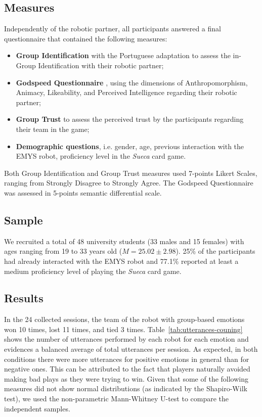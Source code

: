 \subsection{Measures}
Independently of the robotic partner, all participants answered a  final questionnaire that contained the following measures:
\begin{itemize}
\item \textbf{Group Identification} \cite{leach2008group}
with the Portuguese adaptation \cite{ramos2011adaptaccao} 
to assess the in-Group Identification with their robotic partner;
\item \textbf{Godspeed Questionnaire} \cite{bartneck2009measurement}, using the dimensions of Anthropomorphism, Animacy, Likeability, and Perceived Intelligence regarding their robotic partner;
\item \textbf{Group Trust} \cite{allen2004exploring} to assess the perceived trust by the participants regarding their team in the game;
\item \textbf{Demographic questions}, i.e. gender, age, previous interaction with the EMYS robot, proficiency level in the \textit{Sueca} card game.
\end{itemize}
Both Group Identification and Group Trust measures used 7-points Likert Scales, ranging from Strongly Disagree to Strongly Agree. The Godspeed Questionnaire was assessed in 5-points semantic differential scale.

\subsection{Sample}
We recruited a total of 48 university students (33 males and 15 females) with ages ranging from 19 to 33 years old ($M=25.02\pm 2.98$). 25\% of the participants had already interacted with the EMYS robot and 77.1\% reported at least a medium proficiency level of playing the \textit{Sueca} card game.

\subsection{Results}
In the 24 collected sessions, the team of the robot with group-based emotions won 10 times, lost 11 times, and tied 3 times. Table~\ref{tab:utterances-couning} shows the number of utterances performed by each robot for each emotion and evidences a balanced average of total utterances per session. As expected, in both conditions there were more utterances for positive emotions in general than for negative ones. This can be attributed to the fact that players naturally avoided making bad plays as they were trying to win. Given that some of the following measures did not show normal distributions (as indicated by the Shapiro-Wilk test), we used the non-parametric Mann-Whitney U-test to compare the independent samples.

